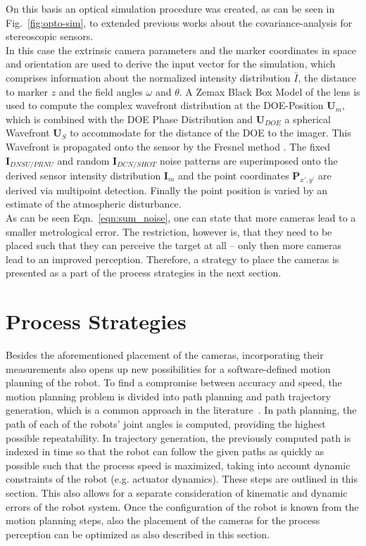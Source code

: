 \documentclass[5p,times,procedia]{elsarticle}
\begin{document}
On this basis an optical simulation procedure was created, as can be seen in Fig.~\ref{fig:opto-sim}, to extended previous works \cite{Liu_2021,Di_Leo_2011} about the covariance-analysis for stereoscopic sensors.\\
%
In this case the extrinsic camera parameters and the marker coordinates in space and orientation are used to derive
the input vector for the simulation, which comprises information about the normalized intensity distribution $\bar{I}$, the distance to marker $z$ and the field angles $\omega$ and $\theta$. A Zemax Black Box Model of the lens is used to compute the complex wavefront distribution at the DOE-Position $\mathbf{U}_m$, which is combined with the DOE Phase Distribution and $\mathbf{U}_{DOE}$ a spherical Wavefront $\mathbf{U}_{S}$ to accommodate for the distance of the DOE to the imager. This Wavefront is propagated onto the sensor by the Fresnel method \cite{Goodman2005}. The fixed $\mathbf{I}_{DNSU/PRNU}$ and random $\mathbf{I}_{DCN/SHOT}$ noise patterns are superimposed onto the derived sensor intensity distribution $\mathbf{I}_m$ and the point coordinates $\mathbf{P}_{x’,y’}$ are derived via multipoint detection.
Finally the point position is varied by an estimate of the atmospheric disturbance.\\
%
As can be seen Eqn.~\ref{eqn:sum_noise}, one can state that more cameras lead to a smaller metrological error.
The restriction, however is, that they need to be placed such that they can perceive the target at all -- only then more cameras lead to an improved perception.
Therefore, a strategy to place the cameras is presented as a part of the process strategies in the next section.
%
\section{Process Strategies}
Besides the aforementioned placement of the cameras, incorporating their measurements also opens up new possibilities for a software-defined motion planning of the robot.
To find a compromise between accuracy and speed, the motion planning problem is divided into path planning and path trajectory generation, which is a common approach in the literature~\cite{Choset05}.
In path planning, the path of each of the robots' joint angles is computed, providing the highest possible repeatability.
In trajectory generation, the previously computed path is indexed in time so that the robot can follow the given paths as quickly as possible such that the process speed is maximized, taking into account dynamic constraints of the robot (e.g. actuator dynamics).
These steps are outlined in this section.
This also allows for a separate consideration of kinematic and dynamic errors of the robot system. 
Once the configuration of the robot is known from the motion planning steps, also the placement of the cameras for the process perception can be optimized as also described in this section. 
%
%
\end{document}
